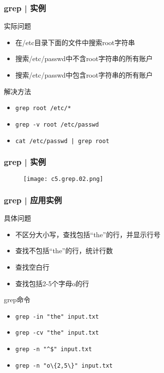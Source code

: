 \begin{frame}[fragile]
  \frametitle{grep | \alert{实例}}
  \begin{block}{实际问题}
    \begin{itemize}
      \item<2-> 在/etc目录下面的文件中搜索root字符串
      \item<4-> 搜索/etc/passwd中不含root字符串的所有账户
      \item<6-> 搜索/etc/passwd中包含root字符串的所有账户
    \end{itemize}
  \end{block}
  \begin{block}{解决方法}
    \begin{itemize}
      \item<3-> \verb|grep root /etc/*|
      \item<5-> \verb|grep -v root /etc/passwd|
      \item<7-> \verb=cat /etc/passwd | grep root=
    \end{itemize}
  \end{block}
\end{frame}

\begin{frame}
  \frametitle{grep | 实例}
  \begin{figure}
    \centering
    \texttt{[image: c5.grep.02.png]}
  \end{figure}
\end{frame}

\begin{frame}[fragile]
  \frametitle{grep | \alert{应用实例}}
  \begin{block}{具体问题}
    \begin{itemize}
      \item<2-> 不区分大小写，查找包括“the”的行，并显示行号
      \item<4-> 查找不包括“the”的行，统计行数
      \item<6-> 查找空白行
      \item<8-> 查找包括2-5个字母o的行
    \end{itemize}
  \end{block}
  \begin{block}{grep命令}
    \begin{itemize}
      \item<3-> \verb|grep -in "the" input.txt|
      \item<5-> \verb|grep -cv "the" input.txt|
      \item<7-> \verb|grep -n "^$" input.txt|
      \item<9-> \verb|grep -n "o\{2,5\}" input.txt|
    \end{itemize}
  \end{block}
\end{frame}

